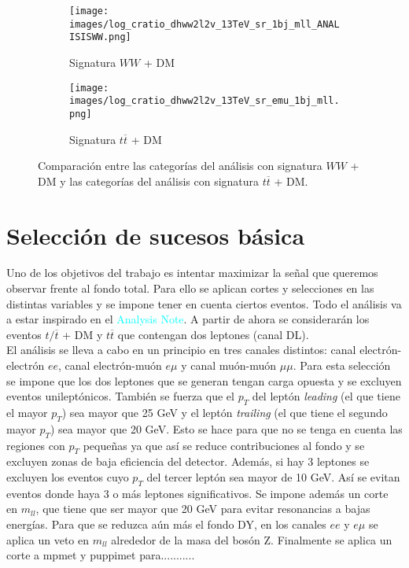 \begin{figure}[h!]
     \centering
     \begin{subfigure}[b]{0.43\textwidth}
         \centering
         \texttt{[image: images/log\_cratio\_dhww2l2v\_13TeV\_sr\_1bj\_mll\_ANALISISWW.png]}
         \caption{Signatura $WW$ + DM}
         \label{fig: ANALISISWW}
     \end{subfigure}
     \begin{subfigure}[b]{0.43\textwidth}
         \centering
         \texttt{[image: images/log\_cratio\_dhww2l2v\_13TeV\_sr\_emu\_1bj\_mll.png]}
         \caption{Signatura $t\overline{t}$ + DM}
         \label{fig: ANALISISttbar}
     \end{subfigure}
     \hfill
     \caption{Comparación entre las categorías del análisis con signatura $WW$ + DM  y las categorías del análisis con signatura $t\overline{t}$ + DM.}
     \label{fig:comparacion_analisisWW_tt}

\end{figure}



\section{Selección de sucesos básica}

Uno de los objetivos del trabajo es intentar maximizar la señal que queremos observar frente al fondo total. Para ello se aplican cortes y selecciones en las distintas variables y se impone tener en cuenta ciertos eventos. Todo el análisis va a estar inspirado en el \textcolor{cyan}{Analysis Note}. A partir de ahora se considerarán los eventos $t/\overline{t}$ + DM y $t\overline{t
}$ que contengan dos leptones (canal DL).\\

El análisis se lleva a cabo en un principio en tres canales distintos: canal electrón-electrón $ee$, canal electrón-muón $e\mu$ y canal muón-muón $\mu \mu$. Para esta selección se impone que los dos leptones que se generan tengan carga opuesta y se excluyen eventos unileptónicos. También se fuerza que el $p_T$ del leptón \textit{leading} (el que tiene el mayor $p_T$) sea mayor que 25 GeV y el leptón \textit{trailing} (el que tiene el segundo mayor $p_T$) sea mayor que 20 GeV. Esto se hace para que no se tenga en cuenta las regiones con $p_T$ pequeñas ya que así se reduce contribuciones al fondo y se excluyen zonas de baja eficiencia del detector. Además, si hay 3 leptones se excluyen los eventos cuyo $p_T$ del tercer leptón sea mayor de 10 GeV. Así se evitan eventos donde haya 3 o más leptones significativos. Se impone además un corte en $m_{ll}$, que tiene que ser mayor que 20 GeV para evitar resonancias a bajas energías. Para que se reduzca aún más el fondo DY, en los canales $ee$ y $e\mu$ se aplica un veto en $m_{ll}$ alrededor de la masa del bosón Z. Finalmente se aplica un corte a mpmet y puppimet para...........\\

